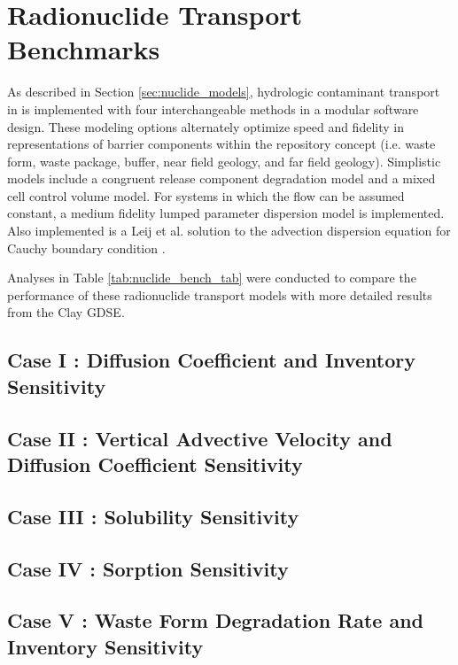 \section{Radionuclide Transport Benchmarks}\label{sec:nuclide_benchmarks}

As described in Section \ref{sec:nuclide_models}, hydrologic contaminant 
transport in \Cyder is implemented with four interchangeable  methods in a 
modular software design. These modeling options alternately optimize speed and 
fidelity in representations of barrier components within the repository concept 
(i.e. waste form, waste package, buffer, near field geology, and far field 
geology)\cite{huff_hydrologic_2013}.  Simplistic models include a congruent 
release component degradation model and a mixed cell control volume model. For 
systems in which the flow can be assumed constant, a medium fidelity lumped 
parameter dispersion model is implemented. Also implemented is a Leij et al. 
solution to the advection dispersion equation for Cauchy boundary condition 
\cite{leij_analytical_1991, van_genuchten_analytical_1982}.  

Analyses in Table \ref{tab:nuclide_bench_tab} were conducted to compare the 
performance of these radionuclide transport models with more detailed results from the 
Clay \gls{GDSE}. 




\subsection{Case I : Diffusion Coefficient and Inventory Sensitivity}

\subsection{Case II : Vertical Advective Velocity and Diffusion Coefficient Sensitivity}

\subsection{Case III : Solubility Sensitivity}

\subsection{Case IV : Sorption Sensitivity}

\subsection{Case V : Waste Form Degradation Rate and Inventory Sensitivity}

%
